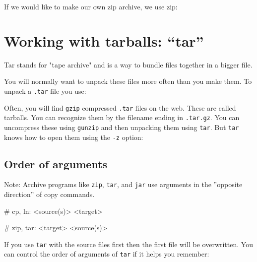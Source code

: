 If we would like to make our own zip archive, we use zip:

\begin{prompt}
\end{prompt}

\section{Working with tarballs: ``tar''}

Tar stands for "tape archive" and is a way to bundle files together in a bigger
file.

You will normally want to unpack these files more often than you make them. To
unpack a \verb|.tar| file you use:

\begin{prompt}
\end{prompt}

Often, you will find \verb|gzip| compressed \verb|.tar| files on the web. These are called
tarballs. You can recognize them by the filename ending in \verb|.tar.gz|.
 You can uncompress these using \verb|gunzip| and then unpacking them using
\verb|tar|. But \verb|tar| knows how to open them using the \verb|-z| option:

\begin{prompt}
\end{prompt}

\subsection{Order of arguments}

Note: Archive programs like \verb|zip|, \verb|tar|, and \verb|jar| use arguments in the
''opposite direction'' of copy commands.

\begin{prompt}
    # cp, ln: <source(s)> <target>

    # zip, tar: <target> <source(s)>
\end{prompt}

If you use \verb|tar| with the source files first then the first file will be
overwritten. You can control the order of arguments of \verb|tar| if it helps you
remember:

\begin{prompt}
\end{prompt}
